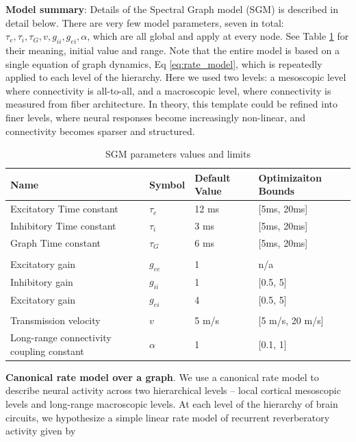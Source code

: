 \textbf{Model summary}: Details of the Spectral Graph model (SGM) is
described in detail below. There are very few model parameters, seven in
total:
$\tau_{e}, \tau_{i}, \tau_{G}, v, g_{ii}, g_{ei}, \alpha$,
which are all global and apply at every node. See Table \ref{tab:SGM_parameters} for
their meaning, initial value and range. Note that the entire model is
based on a single equation of graph dynamics, Eq \ref{eq:rate_model}, which is
repeatedly applied to each level of the hierarchy. Here we used two
levels: a mesoscopic level where connectivity is all-to-all, and a
macroscopic level, where connectivity is measured from fiber
architecture. In theory, this template could be refined into finer
levels, where neural responses become increasingly non-linear, and
connectivity becomes sparser and structured.



\begin{table}
  \caption{SGM parameters values and limits}
  \label{tab:SGM_parameters}
  \centering
 \begin{tabular}{m{14em}|m{2cm}|m{2cm}|m{7em}}
 \hline
 Name & Symbol & Default Value & Optimizaiton Bounds \\
 \hline
 Excitatory Time constant & $ \tau_{e}$ & 12 ms & [5ms, 20ms] \\
 Inhibitory Time constant & $\tau_{i}$ & 3 ms & [5ms, 20ms] \\
 Graph Time constant & $\tau_{G}$ & 6 ms & [5ms, 20ms] \\
 \multicolumn{4}{l}{} \\
 Excitatory gain & $g_{ee}$ & 1 & n/a \\
 Inhibitory gain & $g_{ii}$ & 1 & [0.5, 5] \\
 Excitatory gain & $g_{ei}$ & 4 & [0.5, 5] \\
 \multicolumn{4}{l}{} \\
 Transmission velocity & $v$ & 5 m/s & [5 m/s, 20 m/s] \\
 Long-range connectivity coupling constant & $\alpha$ & 1 & [0.1, 1] \\
 \end{tabular}
\end{table}


\textbf{Canonical rate model over a graph}. We use a canonical rate
model to describe neural activity across two hierarchical levels --
local cortical mesoscopic levels and long-range macroscopic levels. At
each level of the hierarchy of brain circuits, we hypothesize a simple
linear rate model of recurrent reverberatory activity given by

